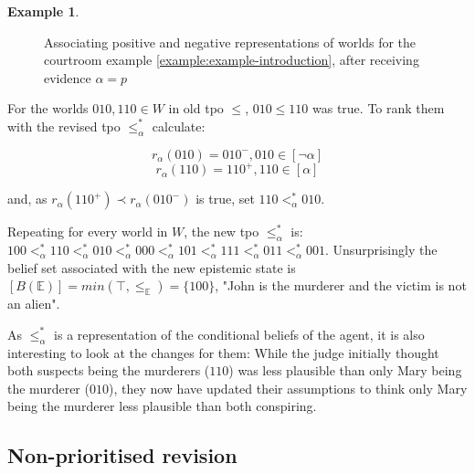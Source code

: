 \documentclass[english, 12pt]{scrartcl}
\theoremstyle{definition}
\newtheorem{example}{Example}[section]
\theoremstyle{definition}
\theoremstyle{definition}
\begin{document}
\begin{example}
\begin{figure}[h]
            \caption{Associating positive and negative representations of worlds for the courtroom example \ref{example:example-introduction}, after receiving evidence $\alpha=p$}
            \label{fig:example-tpo-revised}
    \end{figure}
    
    For the worlds $010, 110 \in W$ in old tpo $\leq$, $010 \leq 110$ was true. To rank them with the revised tpo $\leq_{\alpha}^{\ast}$ calculate:
    
    \begin{equation*}
        r_{\alpha}(010) = 010^{-}, 010 \in [\neg\alpha]
    \end{equation*}
    \begin{equation*}
        r_{\alpha}(110) = 110^{+}, 110 \in [\alpha]
    \end{equation*}
    
    and, as $r_{\alpha}(110^{+}) \prec r_{\alpha}(010^{-})$ is true, set $110 <_{\alpha}^{\ast} 010$.
    
    Repeating for every world in $W$, the new tpo $\leq_{\alpha}^{\ast}$ is: $100 <_{\alpha}^{\ast} 110 <_{\alpha}^{\ast} 010 <_{\alpha}^{\ast} 000 <_{\alpha}^{\ast} 101 <_{\alpha}^{\ast} 111 <_{\alpha}^{\ast} 011 <_{\alpha}^{\ast} 001$. Unsurprisingly the belief set associated with the new epistemic state is $[B(\mathbb{E})] = min(\top, \leq_{\mathbb{E}}) = \{100\}$, "John is the murderer and the victim is not an alien".
    
    As $\leq_{\alpha}^{\ast}$ is a representation of the conditional beliefs of the agent, it is also interesting to look at the changes for them: While the judge initially thought both suspects being the murderers ($110$) was less plausible than only Mary being the murderer ($010$), they now have updated their assumptions to think only Mary being the murderer less plausible than both conspiring.
\end{example}

\subsection{Non-prioritised revision}
\end{document}
